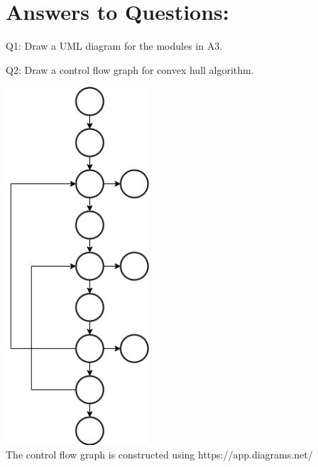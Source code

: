 \documentclass[12pt]{article}
\begin{document}
\begin{itemize}
\end{itemize}
\vspace{3cm}
\section*{Answers to Questions:}

Q1: Draw a UML diagram for the modules in A3.

\medskip
\medskip

\noindent Q2: Draw a control flow graph for convex hull algorithm.

\begin{center}
  \includegraphics[width=0.4\textwidth]{Control.png} \\
  \vspace{2cm}
  The control flow graph is constructed using https://app.diagrams.net/
\end{center}
\end{document}
